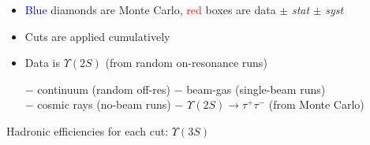 \documentclass[landscape]{article}
\begin{document}
\begin{itemize}

\vfill
  \item \textcolor{blue}{Blue} diamonds are Monte Carlo, \textcolor{red}{red} boxes are data $\pm$ {\it stat} $\pm$ {\it syst}

\vfill
  \item Cuts are applied cumulatively

\vfill
  \item Data is $\Upsilon(2S)$ (from random on-resonance runs) \\

  \vspace{-0.7\baselineskip}
  \hspace{1 cm} \begin{minipage}{0.9\linewidth} $-$
  continuum (random off-res) $-$ beam-gas (single-beam runs) \\ $-$
  cosmic rays (no-beam runs) $-$ $\Upsilon(2S) \to \tau^+ \tau^-$ (from
  Monte Carlo) \end{minipage}

\end{itemize}

\vfill
\pagebreak

Hadronic efficiencies for each cut: $\Upsilon(3S)$
\vspace{1 cm}
\end{document}
